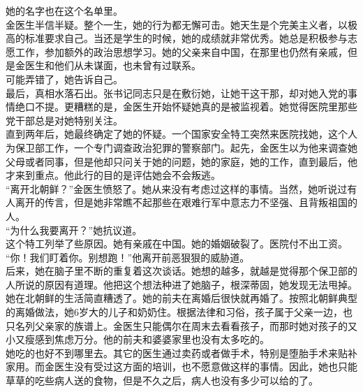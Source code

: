 她的名字也在这个名单里。\\

金医生半信半疑。整个一生，她的行为都无懈可击。她天生是个完美主义者，以极高的标准要求自己。当还是学生的时候，她的成绩就非常优秀。她总是积极参与志愿工作，参加额外的政治思想学习。她的父亲来自中国，在那里也仍然有亲戚，但是金医生和他们从未谋面，也未曾有过联系。\\

可能弄错了，她告诉自己。\\

最后，真相水落石出。张书记同志只是在敷衍她，让她干这干那，却对她入党的事情绝口不提。更糟糕的是，金医生开始怀疑她真的是被监视着。她觉得医院里那些党干部总是对她特别关注。\\

直到两年后，她最终确定了她的怀疑。一个国家安全特工突然来医院找她，这个人为保卫部工作，一个专门调查政治犯罪的警察部门。起先，金医生以为他来调查她父母或者同事，但是他却只问关于她的问题，她的家庭，她的工作，直到最后，他才来到重点。他此行的目的是评估她会不会叛逃。\\

“离开北朝鲜？”金医生愤怒了。她从来没有考虑过这样的事情。当然，她听说过有人离开的传言，但是她非常瞧不起那些在艰难行军中意志力不坚强、且背叛祖国的人。\\

“为什么我要离开？”她抗议道。\\

这个特工列举了些原因。她有亲戚在中国。她的婚姻破裂了。医院付不出工资。\\

“你！我们盯着你。别想跑！”他离开前恶狠狠的威胁道。\\

后来，她在脑子里不断的重复着这次谈话。她想的越多，就越是觉得那个保卫部的人所说的原因有道理。他把这个想法种进了她脑子，根深蒂固，她发现无法甩掉。\\

她在北朝鲜的生活简直糟透了。她的前夫在离婚后很快就再婚了。按照北朝鲜典型的离婚做法，她6岁大的儿子和奶奶住。根据法律和习俗，孩子属于父亲一边，也只名列父亲家的族谱上。金医生只能偶尔在周末去看看孩子，而那时她对孩子的又小又瘦感到焦虑万分。他的前夫和婆婆家里也没有太多吃的。\\

她吃的也好不到哪里去。其它的医生通过卖药或者做手术，特别是堕胎手术来贴补家用。而金医生没有受过这方面的培训，也不愿意做这样的事情。因此，她也只能草草的吃些病人送的食物，但是不久之后，病人也没有多少可以给的了。\\

